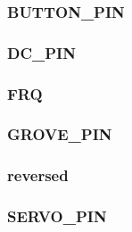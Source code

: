 \documentclass[12pt]{scrartcl} %
\begin{document}
\subsubsection{BUTTON\_PIN}

\subsubsection{DC\_PIN}

\subsubsection{FRQ}

\subsubsection{GROVE\_PIN}

\subsubsection{reversed}

\subsubsection{SERVO\_PIN}

\end{document}
